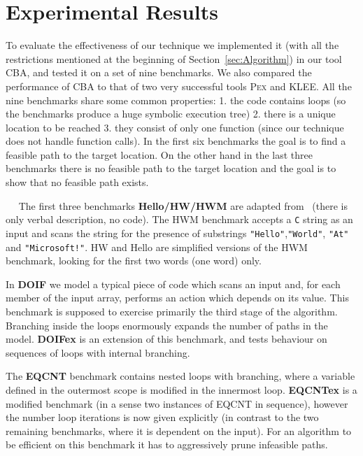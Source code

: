 \documentclass{llncs}
\newcommand{\Pex}{\textsc{Pex}\xspace}
\newcommand{\Klee}{\textsc{KLEE}\xspace}
\newcommand{\CBATool}{\textsc{CBA}\xspace}
\renewcommand{\paragraph}[1]{\vspace{0.2cm}\noindent{\bf #1}~~}
\begin{document}
\section{Experimental Results}
\label{sec:Results}

To evaluate the effectiveness of our technique we implemented it (with all
the restrictions mentioned at the beginning of Section~\ref{sec:Algorithm}) in our tool
\CBATool, and tested it on a set of nine benchmarks. We  also compared the
performance of \CBATool to that of two very successful tools \Pex\cite{TdH08,Pex}
and \Klee\cite{CDE08}. All the nine benchmarks share some common
properties: 1. the code contains loops (so the benchmarks produce a huge symbolic execution
tree) 2. there is a unique location to be reached
3. they consist of only one function (since
our technique does not handle function calls). In the  first six
benchmarks the goal is to find a feasible path to the target location.
On the other hand in the last three benchmarks there is no
feasible path to the target location and the goal is to show that no
feasible path exists.

\paragraph{Benchmark Description}
The first three benchmarks \textbf{Hello/HW/HWM} are adapted from \cite{AGT08}~(there is only
verbal description, no code). The HWM benchmark accepts a \texttt{C} string
as an input and scans the string for the presence of substrings
\texttt{"Hello"},\texttt{"World"}, \texttt{"At"} and \texttt{"Microsoft!"}.
HW and Hello are simplified versions of the HWM benchmark, looking for the
first two words (one word) only. 

In \textbf{DOIF} we model a typical piece of code which scans an input and,
for each member of the input array, performs an action which depends on its
value. This benchmark is supposed to exercise primarily the third stage of
the algorithm.  Branching inside the loops enormously expands the number of
paths in the model. \textbf{DOIFex} is an extension of this benchmark, and
tests behaviour on sequences of loops with internal branching.

The \textbf{EQCNT} benchmark contains nested loops with branching, where a
variable defined in the outermost scope is modified in the innermost
loop. \textbf{EQCNTex} is a modified benchmark (in a sense two instances of
EQCNT in sequence), however the number loop iterations is now given
explicitly (in contrast to the two remaining benchmarks, where it is
dependent on the input). For an algorithm to be efficient on this benchmark
it has to aggressively prune infeasible paths.
\end{document}
